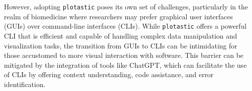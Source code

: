 However, adopting \texttt{plotastic} poses its own set of challenges,
particularly in the realm of biomedicine where researchers may prefer graphical
user interfaces (GUIs) over command-line interfaces (CLIs). While
\texttt{plotastic} offers a powerful CLI that is efficient and capable of
handling complex data manipulation and visualization tasks, the transition from
GUIs to CLIs can be intimidating for those accustomed to more visual interaction
with software. This barrier can be mitigated by the integration of tools like
ChatGPT, which can facilitate the use of CLIs by offering context understanding,
code assistance, and error identification.














